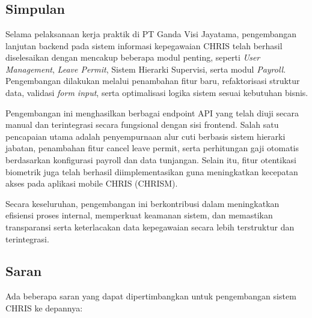 \chapter{\babEmpat}
\section{Simpulan}
Selama pelaksanaan kerja praktik di PT Ganda Visi Jayatama, pengembangan lanjutan backend pada sistem informasi kepegawaian CHRIS telah berhasil diselesaikan dengan mencakup beberapa modul penting, seperti \textit{User Management}, \textit{Leave Permit}, Sistem Hierarki Supervisi, serta modul \textit{Payroll}. Pengembangan dilakukan melalui penambahan fitur baru, refaktorisasi struktur data, validasi \textit{form input}, serta optimalisasi logika sistem sesuai kebutuhan bisnis.

Pengembangan ini menghasilkan berbagai endpoint API yang telah diuji secara manual dan terintegrasi secara fungsional dengan sisi frontend. Salah satu pencapaian utama adalah penyempurnaan alur cuti berbasis sistem hierarki jabatan, penambahan fitur cancel leave permit, serta perhitungan gaji otomatis berdasarkan konfigurasi payroll dan data tunjangan. Selain itu, fitur otentikasi biometrik juga telah berhasil diimplementasikan guna meningkatkan kecepatan akses pada aplikasi mobile CHRIS (CHRISM).

Secara keseluruhan, pengembangan ini berkontribusi dalam meningkatkan efisiensi proses internal, memperkuat keamanan sistem, dan memastikan transparansi serta keterlacakan data kepegawaian secara lebih terstruktur dan terintegrasi.


\section{Saran}
Ada beberapa saran yang dapat dipertimbangkan untuk pengembangan sistem CHRIS ke depannya:

